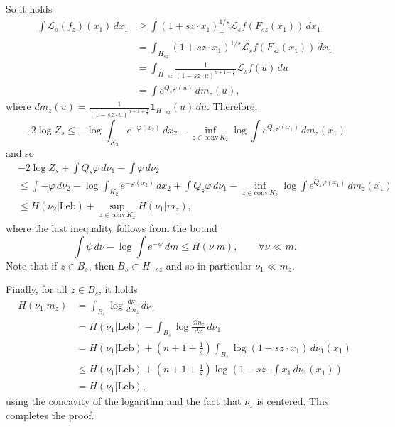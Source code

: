 \documentclass[10pt]{amsart}
\theoremstyle{definition}
\theoremstyle{remark}
\begin{document}
So it holds 
\begin{align*}
\int \mathcal{L}_s(f_z)(x_1)\,dx_1 &\geq \int(1+s z\cdot x_1)_+^{1/s} \mathcal{L}_s f(F_{s z}(x_1))\,dx_1 \\
& = \int_{H_{s z}}(1+s z\cdot x_1)^{1/s} \mathcal{L}_s f(F_{s z}(x_1))\,dx_1 \\
& = \int_{H_{-s z}}\frac{1}{(1-s z\cdot u)^{n+1+\frac{1}{s}}} \mathcal{L}_s f(u)\,du \\
& = \int e^{Q_s \varphi(u)}\,dm_z(u),
\end{align*}
where $dm_z(u) = \frac{1}{(1-s z\cdot u)^{n+1+\frac{1}{s}}} \mathbf{1}_{H_{-s z}}(u)\,du$.
Therefore,
\[
- 2 \log Z_s \leq - \log \int_{K_2} e^{-\varphi (x_2)}\,dx_2 - \inf_{z\in \mathrm{conv}\,K_2} \log \int e^{Q_s \varphi (x_1)}\,dm_z(x_1)
\]
and so 
\begin{align*}
& - 2 \log Z_s+\int Q_s \varphi\,d\nu_1 - \int \varphi\,d\nu_2\\
&\leq  \int -\varphi\,d\nu_2- \log \int_{K_2} e^{-\varphi (x_2)}\,dx_2+ \int Q_s \varphi\,d\nu_1- \inf_{z\in \mathrm{conv}\,K_2} \log \int e^{Q_s \varphi (x_1)}\,dm_z(x_1)\\
 & \leq H(\nu_2 |  \mathrm{Leb}) + \sup_{z\in \mathrm{conv}\,K_2} H(\nu_1 |  m_z),
\end{align*}
where the last inequality follows from the bound
\[
 \int \psi\,d\nu- \log \int e^{-\psi}\,dm \leq H(\nu |  m),\qquad \forall \nu \ll m.
\]
Note that if $z \in B_{s}$, then $B_{s} \subset H_{- s z}$ and so in particular $\nu_1 \ll m_z$.

Finally, for all $z\in B_{s}$, it holds
\begin{align*}
H(\nu_1 |  m_z) & = \int_{B_{s}} \log \frac{d\nu_1}{dm_z}\,d\nu_1\\
& = H(\nu_1 |  \mathrm{Leb})  - \int_{B_{s}} \log \frac{dm_z}{dx}\,d\nu_1\\ 
& = H(\nu_1 |  \mathrm{Leb})  + (n+1+\frac{1}{s}) \int_{B_{s}} \log \left(1 - s z\cdot x_1\right)\,d\nu_1(x_1)\\ 
& \leq H(\nu_1 |  \mathrm{Leb})  + (n+1+\frac{1}{s})  \log \left(1 - s z\cdot \int x_1\,d\nu_1(x_1)\right)\\ 
& = H(\nu_1 |  \mathrm{Leb}),
\end{align*}
using the concavity of the logarithm and the fact that $\nu_1$ is centered. This completes the proof.
\endproof
\end{document}
